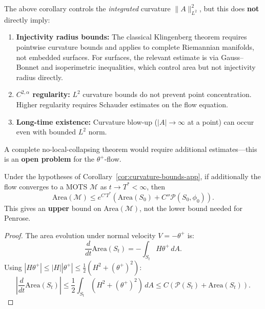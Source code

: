 \begin{remark}
\label{rem:no-collapse-gap-app}
The above corollary controls the \emph{integrated} curvature $\|A\|_{L^2}^2$, but this does \textbf{not} directly imply:
\begin{enumerate}[label=(\roman*)]
\item \textbf{Injectivity radius bounds:} The classical Klingenberg theorem requires pointwise curvature bounds and applies to complete Riemannian manifolds, not embedded surfaces. For surfaces, the relevant estimate is via Gauss--Bonnet and isoperimetric inequalities, which control area but not injectivity radius directly.
\item \textbf{$C^{2,\alpha}$ regularity:} $L^2$ curvature bounds do not prevent point concentration. Higher regularity requires Schauder estimates on the flow equation.
\item \textbf{Long-time existence:} Curvature blow-up ($|A| \to \infty$ at a point) can occur even with bounded $L^2$ norm.
\end{enumerate}
A complete no-local-collapsing theorem would require additional estimates---this is an \textbf{open problem} for the $\theta^+$-flow.
\end{remark}

\begin{corollary}
\label{cor:weak-area-app}
Under the hypotheses of Corollary~\ref{cor:curvature-bounds-app}, if additionally the flow converges to a MOTS $\mathcal{M}$ as $t \to T^* < \infty$, then
\begin{equation}
\mathrm{Area}(\mathcal{M}) \leq e^{C'T^*}\left(\mathrm{Area}(S_0) + C''\mathcal{P}(S_0, \phi_0)\right).
\end{equation}
This gives an \textbf{upper} bound on $\mathrm{Area}(\mathcal{M})$, not the lower bound needed for Penrose.
\end{corollary}

\begin{proof}
The area evolution under normal velocity $V = -\theta^+$ is:
\begin{equation}
\frac{d}{dt}\mathrm{Area}(S_t) = -\int_{S_t} H\theta^+ \, dA.
\end{equation}
Using $|H\theta^+| \leq |H||\theta^+| \leq \frac{1}{2}(H^2 + (\theta^+)^2)$:
\begin{equation}
\left|\frac{d}{dt}\mathrm{Area}(S_t)\right| \leq \frac{1}{2}\int_{S_t} (H^2 + (\theta^+)^2) \, dA \leq C(\mathcal{P}(S_t) + \mathrm{Area}(S_t)).
\end{equation}
\end{proof}
